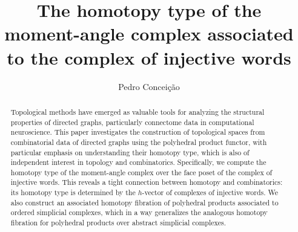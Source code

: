 \documentclass[a4paper,11pt]{article}
\theoremstyle{definition}
\begin{document}

\title{The homotopy type of the moment-angle complex associated to the complex of injective words}

\author{
Pedro Conceição
}


\date{}

\maketitle
\begin{abstract}
Topological methods have emerged as valuable tools for analyzing the structural properties of directed graphs, particularly connectome data in computational neuroscience. This paper investigates the construction of topological spaces from combinatorial data of directed graphs using the polyhedral product functor, with particular emphasis on understanding their homotopy type, which is also of independent interest in topology and combinatorics. Specifically, we compute the homotopy type of the moment-angle complex over the face poset of the complex of injective words. This reveals a tight connection between homotopy and combinatorics: its homotopy type is determined by the $h$-vector of complexes of injective words. We also construct an associated homotopy fibration of polyhedral products associated to ordered simplicial complexes, which in a way generalizes the analogous homotopy fibration for polyhedral products over abstract simplicial complexes.
\end{abstract}
\vspace{1cm}
\end{document}
